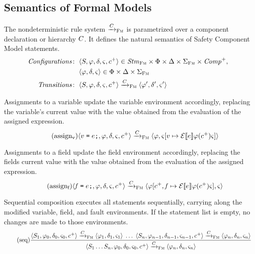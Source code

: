\documentclass[a4paper,10pt,english]{article}
\begin{document}
\subsection{Semantics of Formal Models}
The nondeterministic rule system $\xrightarrow{C}_\textsc{Fm}$ is parametrized over a component declaration or hierarchy $C$. It defines
the natural semantics of Safety Component Model statements.
\begin{align*}
	\mathit{Configurations} \colon & \;\langle S, \varphi, \delta, \varsigma, c^+ \rangle \in \mathit{Stm}_\textsc{Fm}
	\times \Phi \times \Delta \times \Sigma_\textsc{Fm} \times \mathit{Comp}^+,
	\\
	& \; \langle \varphi, \delta, \varsigma \rangle \in \Phi \times \Delta \times \Sigma_\textsc{Fm}
	\\
	\mathit{Transitions} \colon & \;\langle S, \varphi, \delta, \varsigma, c^+ \rangle \xrightarrow{C}_\textsc{Fm}
	\langle \varphi', \delta', \varsigma' \rangle
\end{align*}

Assignments to a variable update the variable environment accordingly, replacing the variable's current value with the value
obtained from the evaluation of the assigned expression.
\begin{equation*}
	\tag{assign${}_\text{v}$}
	\configurationFm{\assignVarStm{\var}{\expr}, \fieldEnv, \faultEnv, \varEnvFm, \toListNE{\comp}}
		\stmArrowFm
	\configurationFm{\fieldEnv, \varEnvFm[\var \mapsto \ExprSem{\expr} \fieldEnv(\toListNE{\comp}) \varEnvFm]}
\end{equation*}

Assignments to a field update the field environment accordingly, replacing the fields current value with the value
obtained from the evaluation of the assigned expression.
\begin{equation*}
	\tag{assign${}_\text{f}$}
	\configurationFm{\assignVarStm{\field}{\expr}, \fieldEnv, \faultEnv, \varEnvFm, \toListNE{\comp}}
		\stmArrowFm
	\configurationFm{\fieldEnv[\toListNE{\comp}, \field \mapsto \ExprSem{\expr} \fieldEnv(\toListNE{\comp}) \varEnvFm], \varEnvFm}
\end{equation*}

Sequential composition executes all statements sequentially, carrying along the modified variable, field, and fault environments.
If the statement list is empty, no changes are made to those environments.
\begin{equation*}
	\tag{seq}
	\dfrac
	{
		\langle S_1, \varphi_0, \delta_0, \varsigma_0, c^+ \rangle
			\xrightarrow{C}_\textsc{Fm}
		\langle \varphi_1, \delta_1, \varsigma_1 \rangle
		\;
		\ldots
		\;
		\langle S_n, \varphi_{n-1}, \delta_{n-1}, \varsigma_{n-1}, c^+ \rangle
			\xrightarrow{C}_\textsc{Fm}
		\langle \varphi_n, \delta_n, \varsigma_n \rangle
	}
	{
		\langle S_1 \ldots S_n, \varphi_0, \delta_0, \varsigma_0, c^+ \rangle
			\xrightarrow{C}_\textsc{Fm}
		\langle \varphi_n, \delta_n, \varsigma_n \rangle
	}
\end{equation*}
\end{document}
